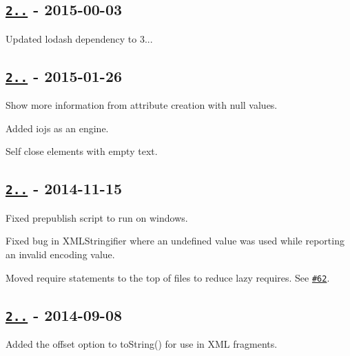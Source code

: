 \subsection*{\href{https://github.com/oozcitak/xmlbuilder-js/compare/v2.4.6...v2.5.0}{\tt 2..} -\/ 2015-\/00-\/03}


\begin{DoxyItemize}
\item Updated lodash dependency to 3...
\end{DoxyItemize}

\subsection*{\href{https://github.com/oozcitak/xmlbuilder-js/compare/v2.4.5...v2.4.6}{\tt 2..} -\/ 2015-\/01-\/26}


\begin{DoxyItemize}
\item Show more information from attribute creation with null values.
\item Added iojs as an engine.
\item Self close elements with empty text.
\end{DoxyItemize}

\subsection*{\href{https://github.com/oozcitak/xmlbuilder-js/compare/v2.4.4...v2.4.5}{\tt 2..} -\/ 2014-\/11-\/15}


\begin{DoxyItemize}
\item Fixed prepublish script to run on windows.
\item Fixed bug in X\+M\+L\+Stringifier where an undefined value was used while reporting an invalid encoding value.
\item Moved require statements to the top of files to reduce lazy requires. See \href{https://github.com/oozcitak/xmlbuilder-js/issues/62}{\tt \#62}.
\end{DoxyItemize}

\subsection*{\href{https://github.com/oozcitak/xmlbuilder-js/compare/v2.4.3...v2.4.4}{\tt 2..} -\/ 2014-\/09-\/08}


\begin{DoxyItemize}
\item Added the {\ttfamily offset} option to {\ttfamily to\+String()} for use in X\+ML fragments.
\end{DoxyItemize}

